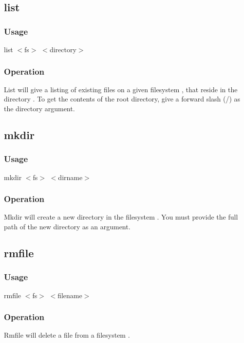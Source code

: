 \subsection{list}
    \subsubsection*{Usage}
	list $<$fs$>$ $<$directory$>$
    \subsubsection*{Operation}
	List will give a listing of existing files on a given filesystem , that
	reside in the directory . To get the contents of the root directory,
	give a forward slash (/) as the directory argument.

\subsection{mkdir}
    \subsubsection*{Usage}
	mkdir $<$fs$>$ $<$dirname$>$
    \subsubsection*{Operation}
	Mkdir will create a new directory in the filesystem . You must provide the full path
	of the new directory as an argument.

\subsection{rmfile}
    \subsubsection*{Usage}
	rmfile $<$fs$>$ $<$filename$>$
    \subsubsection*{Operation}
	Rmfile will delete a file from a filesystem .

